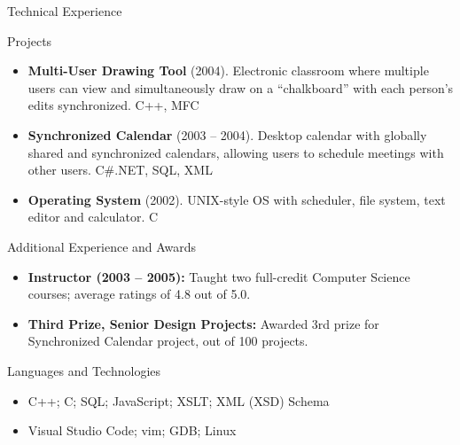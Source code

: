\documentclass[]{mcdowellcv}
\begin{document}
	\begin{cvsection}{Technical Experience}
		\begin{cvsubsection}{Projects}{}{}
			\begin{itemize}
				\item \textbf{Multi-User Drawing Tool} (2004). Electronic classroom where multiple users can view and simultaneously draw on a “chalkboard” with each person’s edits synchronized.  C++, MFC
				\item \textbf{Synchronized Calendar} (2003 – 2004). Desktop calendar with globally shared and synchronized calendars, allowing users to schedule meetings with other users.  C\#.NET, SQL, XML
				\item \textbf{Operating System} (2002).  UNIX-style OS with scheduler, file system, text editor and calculator. C
			\end{itemize}
		\end{cvsubsection}
	\end{cvsection}
	
	\begin{cvsection}{Additional Experience and Awards}
		\begin{cvsubsection}{}{}{}	
			\begin{itemize}
				\item \textbf{Instructor (2003 – 2005):} Taught two full-credit Computer Science courses; average ratings of 4.8 out of 5.0.
				\item \textbf{Third Prize, Senior Design Projects:} Awarded 3rd prize for Synchronized Calendar project, out of 100 projects.
			\end{itemize}
		\end{cvsubsection}
	\end{cvsection}
	
	\begin{cvsection}{Languages and Technologies}
		\begin{cvsubsection}{}{}{}	
			\begin{itemize}
				\item C++; C; SQL; JavaScript; XSLT; XML (XSD) Schema 
				\item Visual Studio Code; vim; GDB; Linux 
			\end{itemize}
		\end{cvsubsection}
	\end{cvsection}
	
\end{document}
